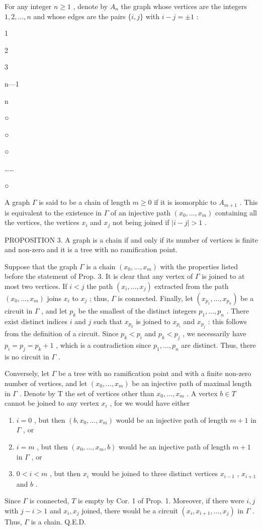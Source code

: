 For any integer \(n \geqslant 1\) , denote by \(A_{n}\) the graph whose vertices are the integers \(1, 2, \ldots, n\) and whose edges are the pairs \(\{i, j\}\) with \(i - j = \pm 1\) :

1

2

3

n---1

n

○

○

○

\ldots\ldots{}

○

A graph \(\Gamma\) is said to be a chain of length \(m \geqslant 0\) if it is isomorphic to \(A_{m+1}\) . This is equivalent to the existence in \(\Gamma\) of an injective path \((x_{0}, \ldots, x_{m})\) containing all the vertices, the vertices \(x_{i}\) and \(x_{j}\) not being joined if \(|i-j| > 1\) .

PROPOSITION 3. A graph is a chain if and only if its number of vertices is finite and non-zero and it is a tree with no ramification point.

Suppose that the graph \(\Gamma\) is a chain \((x_0, \ldots, x_m)\) with the properties listed before the statement of Prop. 3. It is clear that any vertex of \(\Gamma\) is joined to at most two vertices. If \(i < j\) the path \((x_i, \ldots, x_j)\) extracted from the path \((x_0, \ldots, x_m)\) joins \(x_i\) to \(x_j\) ; thus, \(\Gamma\) is connected. Finally, let \((x_{p_1}, \ldots, x_{p_n})\) be a circuit in \(\Gamma\) , and let \(p_k\) be the smallest of the distinct integers \(p_1, \ldots, p_n\) . There exist distinct indices \(i\) and \(j\) such that \(x_{p_k}\) is joined to \(x_{p_i}\) and \(x_{p_j}\) : this follows from the definition of a circuit. Since \(p_k < p_i\) and \(p_k < p_j\) , we necessarily have \(p_i = p_j = p_k + 1\) , which is a contradiction since \(p_1, \ldots, p_n\) are distinct. Thus, there is no circuit in \(\Gamma\) .

Conversely, let \(\Gamma\) be a tree with no ramification point and with a finite non-zero number of vertices, and let \((x_0, \ldots, x_m)\) be an injective path of maximal length in \(\Gamma\) . Denote by T the set of vertices other than \(x_0, \ldots, x_m\) . A vertex \(b \in T\) cannot be joined to any vertex \(x_i\) , for we would have either

\begin{enumerate}
\def\labelenumi{\alph{enumi})}
\item
  \(i = 0\) , but then \((b, x_0, \ldots, x_m)\) would be an injective path of length \(m + 1\) in \(\Gamma\) , or
\item
  \(i = m\) , but then \((x_0, \ldots, x_m, b)\) would be an injective path of length \(m + 1\) in \(\Gamma\) , or
\item
  \(0 < i < m\) , but then \(x_{i}\) would be joined to three distinct vertices \(x_{i-1}\) , \(x_{i+1}\) and \(b\) .
\end{enumerate}

Since \(\Gamma\) is connected, \(T\) is empty by Cor. 1 of Prop. 1. Moreover, if there were \(i,j\) with \(j - i > 1\) and \(x_{i}, x_{j}\) joined, there would be a circuit \((x_{i}, x_{i+1}, \ldots, x_{j})\) in \(\Gamma\) . Thus, \(\Gamma\) is a chain. Q.E.D.

